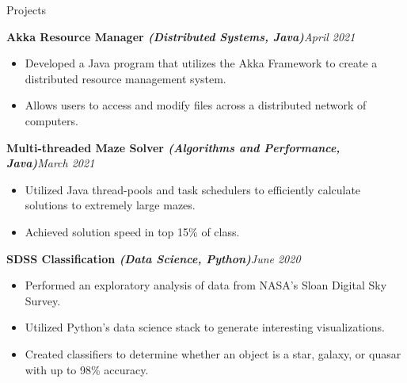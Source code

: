 \documentclass{resume} %
\begin{document}
\begin{rSection}{Projects}

\begin{rSubsection}{\bf Akka Resource Manager \hspace{0.1em} \it (Distributed Systems, Java)}{\em April 2021}{}{}
\begin{itemize}
    \item Developed a Java program that utilizes the Akka Framework to create a distributed resource management system.\vspace{-0.6em}
    \item Allows users to access and modify files across a distributed network of computers.
\end{itemize}
\end{rSubsection}

\begin{rSubsection}{\bf Multi-threaded Maze Solver \hspace{0.1em} \it (Algorithms and Performance, Java)}{\em March 2021}{}{}
\begin{itemize}
    \item Utilized Java thread-pools and task schedulers to efficiently calculate solutions to extremely large mazes.\vspace{-0.6em}
    \item Achieved solution speed in top 15\% of class.
\end{itemize}
\end{rSubsection}

\begin{rSubsection}{\bf SDSS Classification \hspace{0.1em} \it (Data Science, Python)}{\em June 2020}{}{}
\begin{itemize}
    \item Performed an exploratory analysis of data from NASA's Sloan Digital Sky Survey. \vspace{-0.6em}
    \item Utilized Python's data science stack to generate interesting visualizations. \vspace{-0.6em}
    \item Created classifiers to determine whether an object is a star, galaxy, or quasar with up to 98\% accuracy.
\end{itemize}
\end{rSubsection}



\end{rSection}
\end{document}

